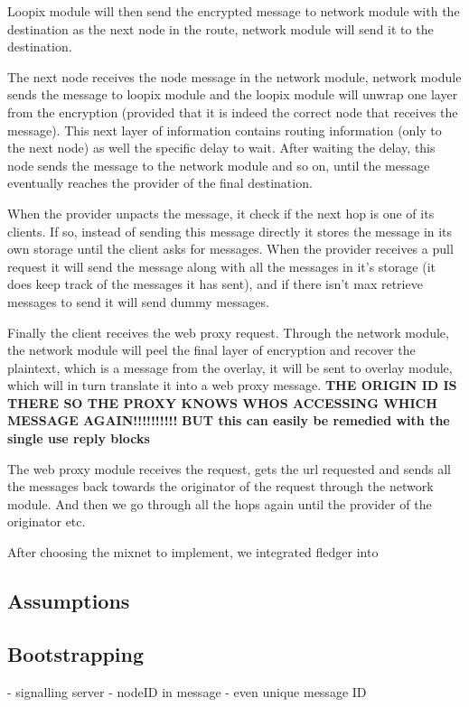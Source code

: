 \documentclass[a4paper,11pt,oneside]{report}
\begin{document}
Loopix module will then send the encrypted message to network module with the destination as the next node in the route, network module will send it to the destination.

The next node receives the node message in the network module, network module sends the message to loopix module and the loopix module will unwrap one layer from the encryption (provided that it is indeed the correct node that receives the message). This next layer of information contains routing information (only to the next node) as well the specific delay to wait. After waiting the delay, this node sends the message to the network module and so on, until the message eventually reaches the provider of the final destination.

When the provider unpacts the message, it check if the next hop is one of its clients. If so, instead of sending this message directly it stores the message in its own storage until the client asks for messages. When the provider receives a pull request it will send the message along with all the messages in it's storage (it does keep track of the messages it has sent), and if there isn't max retrieve messages to send it will send dummy messages.

Finally the client receives the web proxy request. Through the network module, the network module will peel the final layer of encryption and recover the plaintext, which is a message from the overlay, it will be sent to overlay module, which will in turn translate it into a web proxy message.
\textbf{THE ORIGIN ID IS THERE SO THE PROXY KNOWS WHOS ACCESSING WHICH MESSAGE AGAIN!!!!!!!!!!}
\textbf{BUT this can easily be remedied with the single use reply blocks}

The web proxy module receives the request, gets the url requested and sends all the messages back towards the originator of the request through the network module. And then we go through all the hops again until the provider of the originator etc.

After choosing the mixnet to implement, we integrated fledger into 

\subsection{Assumptions}

\subsection{Bootstrapping}
- signalling server
- nodeID in message
- even unique message ID
\end{document}
